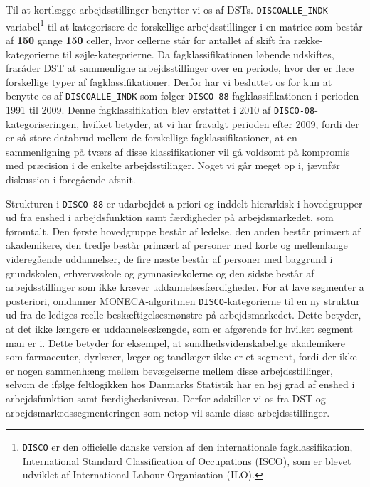 Til at kortlægge arbejdsstillinger benytter vi os af DSTs. \texttt{DISCOALLE\_INDK}-variabel\footnote{\texttt{DISCO} er den officielle danske version af den internationale fagklassifikation, International Standard Classification of Occupations (ISCO), som er blevet udviklet af International Labour Organisation (ILO).} til at kategorisere de forskellige arbejdsstillinger i en matrice som består af \textbf{150} gange \textbf{150} celler, hvor cellerne står for antallet af skift fra række-kategorierne til søjle-kategorierne. Da fagklassifikationen løbende udskiftes, fraråder DST at sammenligne arbejdsstillinger over en periode, hvor der er flere forskellige typer af fagklassifikationer. Derfor har vi besluttet os for kun at benytte os af \texttt{DISCOALLE\_INDK} som følger \texttt{DISCO-88}-fagklassifikationen i perioden 1991 til 2009. Denne fagklassifikation blev erstattet i 2010 af \texttt{DISCO-08}-kategoriseringen, hvilket betyder, at vi har fravalgt perioden efter 2009, fordi der er så store databrud mellem de forskellige fagklassifikationer, at en sammenligning på tværs af disse klassifikationer vil gå voldsomt på kompromis med præcision i de enkelte arbejdsstilinger. Noget vi går meget op i, jævnfør diskussion i foregående afsnit.

Strukturen i \texttt{DISCO-88} er udarbejdet a priori og inddelt hierarkisk i hovedgrupper ud fra enshed i arbejdsfunktion samt færdigheder på arbejdsmarkedet, som føromtalt. Den første hovedgruppe består af ledelse, den anden består  primært af akademikere, den tredje består primært af personer med korte og mellemlange videregående uddannelser, de fire næste består af personer med baggrund i grundskolen, erhvervsskole og gymnasieskolerne og den sidste består af arbejdsstillinger som ikke kræver uddannelsesfærdigheder. For at lave segmenter a posteriori, omdanner MONECA-algoritmen \texttt{DISCO}-kategorierne til en ny struktur ud fra de lediges reelle beskæftigelsesmønstre på arbejdsmarkedet. Dette betyder, at det ikke længere er uddannelseslængde, som er afgørende for hvilket segment man er i. Dette betyder for eksempel, at sundhedsvidenskabelige akademikere som farmaceuter, dyrlærer, læger og tandlæger ikke er et segment, fordi der ikke er nogen sammenhæng mellem bevægelserne mellem disse arbejdsstillinger, selvom de ifølge feltlogikken hos Danmarks Statistik har en høj grad af enshed i arbejdsfunktion samt færdighedsniveau. Derfor adskiller vi os fra DST og arbejdsmarkedssegmenteringen som netop vil samle disse arbejdsstillinger.

